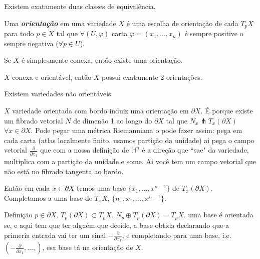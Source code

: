 \begin{remark}\leavevmode
Existem exatamente duas classes de equivalência.
\end{remark}

\begin{defn}\leavevmode
Uma \textit{\textbf{orientação}} em uma variedade \(X\) é uma escolha de orientação de cada \(T_pX\) para todo \(p \in X\) tal que \(\forall (U,\varphi)\) carta \(\varphi=(x_1,\ldots,x_n)\) é sempre positive o sempre negativa (\(\forall p \in U\)).
\end{defn}

\begin{remark}[Extra]\leavevmode
Se \(X\) é simplesmente conexa, então existe uma orientação.
\end{remark}

\begin{remark}\leavevmode
\(X\) conexa e orientável, então \(X\) possui exatamente 2 orientações.
\end{remark}

\begin{remark}\leavevmode
Existem variedades não orientáveis.
\end{remark}

\(X\) variedade orientada com bordo induiz uma orientação em \(\partial X\). É porque existe um fibrado vetorial \(N \) de dimenão 1 ao longo do \(\partial  X\) tal que \(N_x \pitchfork T_x (\partial X)\) \(\forall  x \in \partial  X\). Pode pegar uma métrica Riemanniana o pode fazer assim: pega em cada carta (atlas localmente finito, usamos partição da unidade) ai pega o campo vetorial \(\frac{\partial }{\partial x_1}\) que com a nossa definição de \( \mathbb{H}^{n}\) é a direção que ``sae" da variedade, multiplica com a partição da unidade e some. Ai você tem um campo vetorial que não está no fibrado tangenta ao bordo.

Então em cada \(x \in \partial X\) temos uma base \(\{x_1,\ldots,x^{n-1}\}\) de \(T_x(\partial X)\). Completamos a uma base de \(T_xX\), \(\{n_x,x_1,\ldots,x^{n-1}\}\).

\begin{thing2}{Definição}\leavevmode
\(p \in \partial X\). \(T_p(\partial X) \subset T_pX\). \(N_p \oplus  T_p(\partial X) = T_pX\). uma base é orientada se, {\color{2}e aqui tem que ter alguém que decide}, a base obtida declarando que a primeria entrada vai ter um sinal \(-\frac{\partial }{\partial x_1}\), e completando para uma base, i.e. \(\left(- \frac{\partial }{\partial x_1},\ldots,\right) \), esa base tá na orientação de \(X\).
\end{thing2}

